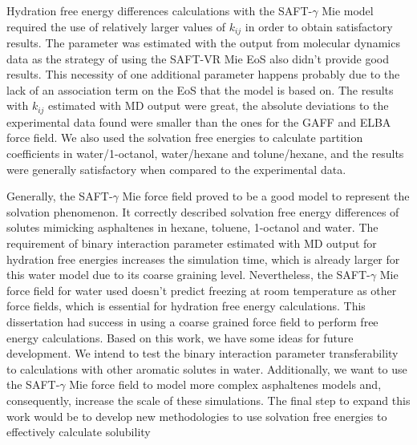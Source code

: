Hydration free energy differences calculations with the SAFT-$\gamma$ Mie model
required the use of relatively larger values of $k_{ij}$ in order to obtain satisfactory results.
The parameter was estimated with the output from molecular dynamics data as
the strategy of using the SAFT-VR Mie EoS also didn’t provide good results. This
necessity of one additional parameter happens probably due to the lack of an association term
on the EoS that the model is based on. The results with $k_{ij}$ estimated with MD output
were great, the absolute deviations to the experimental data found were smaller than
the ones for the GAFF and ELBA force field. We also used the solvation free energies to calculate partition coefficients in water/1-octanol, water/hexane and tolune/hexane, and the results were generally satisfactory when compared to the experimental data.

Generally, the SAFT-$\gamma$ Mie force field proved to be a good model to represent the solvation
phenomenon. It correctly described solvation free energy differences of solutes
mimicking asphaltenes in hexane, toluene, 1-octanol and water. The requirement of
binary interaction parameter estimated with MD output for hydration free energies
increases the simulation time, which is already larger for this water model due to its
coarse graining level. Nevertheless, the SAFT-$\gamma$ Mie force field for water used doesn’t predict freezing at room temperature as other force fields, which is essential for hydration
free energy calculations.
This dissertation had success in using a coarse grained force field to perform
free energy calculations. Based on this work, we have some ideas for future development. We intend to test the binary interaction parameter transferability to calculations with other
aromatic solutes in water. Additionally, we want to use the SAFT-$\gamma$ Mie force field to model more
complex asphaltenes models and, consequently, increase the scale of these simulations. The final step to expand this work would be to develop new methodologies to use solvation free energies to effectively calculate solubility


